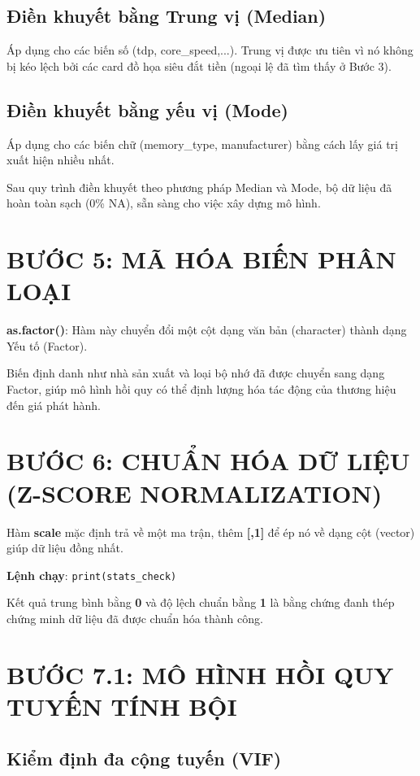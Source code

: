 \documentclass[12pt,a4paper]{article}
\begin{document}
\subsection{Điền khuyết bằng Trung vị (Median)}
Áp dụng cho các biến số (tdp, core\_speed,...). Trung vị được ưu tiên vì nó không bị kéo lệch bởi các card đồ họa siêu đắt tiền (ngoại lệ đã tìm thấy ở Bước 3).

\subsection{Điền khuyết bằng yếu vị (Mode)}
Áp dụng cho các biến chữ (memory\_type, manufacturer) bằng cách lấy giá trị xuất hiện nhiều nhất.

Sau quy trình điền khuyết theo phương pháp Median và Mode, bộ dữ liệu đã hoàn toàn sạch (0\% NA), sẵn sàng cho việc xây dựng mô hình.

\section{BƯỚC 5: MÃ HÓA BIẾN PHÂN LOẠI}

\textbf{as.factor()}: Hàm này chuyển đổi một cột dạng văn bản (character) thành dạng Yếu tố (Factor).

Biến định danh như nhà sản xuất và loại bộ nhớ đã được chuyển sang dạng Factor, giúp mô hình hồi quy có thể định lượng hóa tác động của thương hiệu đến giá phát hành.

\section{BƯỚC 6: CHUẨN HÓA DỮ LIỆU (Z-SCORE NORMALIZATION)}

Hàm \textbf{scale} mặc định trả về một ma trận, thêm \textbf{[,1]} để ép nó về dạng cột (vector) giúp dữ liệu đồng nhất.

\textbf{Lệnh chạy}: \texttt{print(stats\_check)}

Kết quả trung bình bằng \textbf{0} và độ lệch chuẩn bằng \textbf{1} là bằng chứng đanh thép chứng minh dữ liệu đã được chuẩn hóa thành công.

\section{BƯỚC 7.1: MÔ HÌNH HỒI QUY TUYẾN TÍNH BỘI}

\subsection{Kiểm định đa cộng tuyến (VIF)}
\end{document}
